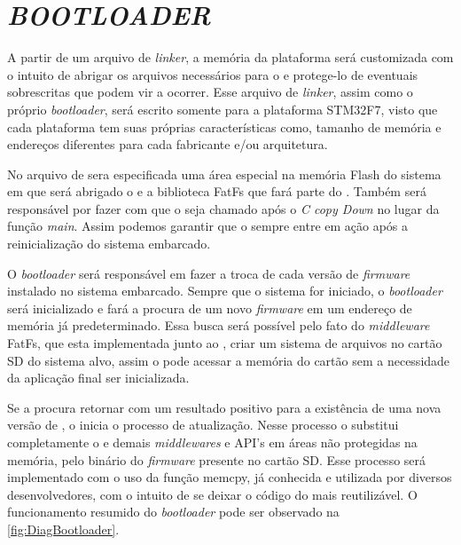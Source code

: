 \section{\textit{BOOTLOADER}}
\label{sec:Bootloader}

A partir de um arquivo de \textit{linker}, a memória da plataforma será customizada com o intuito de abrigar os arquivos necessários para o \bootloader e protege-lo de eventuais sobrescritas que podem vir a ocorrer. Esse arquivo de \textit{linker}, assim como o próprio \textit{bootloader}, será escrito somente para a plataforma STM32F7, visto que cada plataforma tem suas próprias características como, tamanho de memória e endereços diferentes para cada fabricante e/ou arquitetura.

No arquivo de \linker sera especificada uma área especial na memória Flash do sistema em que será abrigado o \bootloader e a biblioteca FatFs que fará parte do \bootloader. Também será responsável por fazer com que o \bootloader seja chamado após o \textit{C copy Down} no lugar da função \textit{main}. Assim podemos garantir que o \bootloader sempre entre em ação após a reinicialização do sistema embarcado.


O \textit{bootloader} será responsável em fazer a troca de cada versão de \textit{firmware} instalado no sistema embarcado. Sempre que o sistema for iniciado, o \textit{bootloader} será inicializado e fará a procura de um novo \textit{firmware} em um endereço de memória já predeterminado. Essa busca será possível pelo fato do \textit{middleware} FatFs, que esta implementada junto ao \bootloader, criar um sistema de arquivos no cartão SD do sistema alvo, assim o \bootloader pode acessar a memória do cartão sem a necessidade da aplicação final ser inicializada.

Se a procura retornar com um resultado positivo para a existência de uma nova versão de \software, o \bootloader inicia o processo de atualização. Nesse processo o \bootloader substitui completamente o \software e demais \textit{middlewares} e API's em áreas não protegidas na memória, pelo binário do \textit{firmware} presente no cartão SD. Esse processo será implementado com o uso da  função memcpy, já conhecida e utilizada por diversos desenvolvedores, com o intuito de se deixar o código do \bootloader mais reutilizável. O funcionamento resumido do \textit{bootloader} pode ser observado na \autoref{fig:DiagBootloader}.

